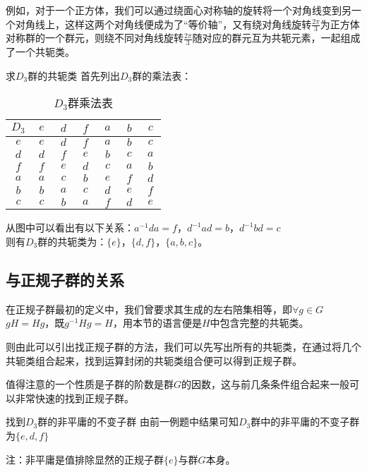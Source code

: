 例如，对于一个正方体，我们可以通过绕面心对称轴的旋转将一个对角线变到另一个对角线上，这样这两个对角线便成为了“等价轴”，又有绕对角线旋转$\frac{2\pi}{3}$为正方体对称群的一个群元，则绕不同对角线旋转$\frac{2\pi}{3}$随对应的群元互为共轭元素，一起组成了一个共轭类。

\begin{example}{求$D_3$群的共轭类}
首先列出$D_3$群的乘法表：
\begin{table}[ht]
\centering
\caption{$D_3$群乘法表}\label{tab_gpcon_1}
\begin{tabular}{|c|c|c|c|c|c|c|}
\hline
        $D_3$ & $~e~$ & $~d~$ & $~f~$ & $~a~$ & $~b~$ & $~c~$ \\ \hline
        $e$ & $e$ & $d$ & $f$ & $a$ & $b$ & $c$ \\ \hline
        $d$ & $d$ & $f$ & $e$ & $b$ & $c$ & $a$ \\ \hline
        $f$ & $f$ & $e$ & $d$ & $c$ & $a$ & $b$ \\ \hline
        $a$ & $a$ & $c$ & $b$ & $e$ & $f$ & $d$ \\ \hline
        $b$ & $b$ & $a$ & $c$ & $d$ & $e$ & $f$ \\ \hline
        $c$ & $c$ & $b$ & $a$ & $f$ & $d$ & $e$ \\ \hline
\end{tabular}
\end{table}

从图中可以看出有以下关系：$a^{-1}da=f$，$d^{-1}ad=b$，$d^{-1}bd=c$\\
则有$D_3$群的共轭类为：$\{e\}$，$\{d,f\}$，$\{a,b,c\}$。
\end{example}

\subsection{与正规子群的关系}
在正规子群最初的定义中，我们曾要求其生成的左右陪集相等，即$\forall g \in G$ \\
$gH=Hg$，既$g^{-1}Hg=H$，用本节的语言便是$H$中包含完整的共轭类。

则由此可以引出找正规子群的方法，我们可以先写出所有的共轭类，在通过将几个共轭类组合起来，找到运算封闭的共轭类组合便可以得到正规子群。

值得注意的一个性质是子群的阶数是群$G$的因数，这与前几条条件组合起来一般可以非常快速的找到正规子群。

\begin{example}{找到$D_3$群的非平庸的不变子群}
由前一例题中结果可知$D_3$群中的非平庸的不变子群为$\{e,d,f\}$

注：非平庸是值排除显然的正规子群$\{e\}$与群$G$本身。
\end{example}
